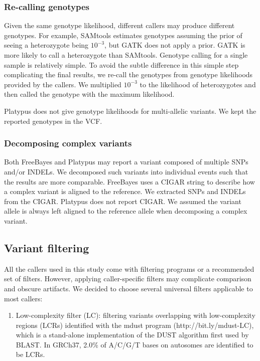 \documentclass{bioinfo-ori}
\begin{document}
\begin{methods}
\subsubsection{Re-calling genotypes} Given the same genotype likelihood,
different callers may produce different genotypes. For example, SAMtools
estimates genotypes assuming the prior of seeing a heterozygote being $10^{-3}$,
but GATK does not apply a prior. GATK is more likely to call a heterozygote
than SAMtools. Genotype calling for a single sample is relatively simple.
To avoid the subtle difference in this simple step complicating the final
results, we re-call the genotypes from genotype likelihoods provided by the
callers.  We multiplied $10^{-3}$ to the likelihood of heterozygotes and then
called the genotype with the maximum likelihood.

Platypus does not give genotype likelihoods for multi-allelic variants. We
kept the reported genotypes in the VCF.

\subsubsection{Decomposing complex variants} Both FreeBayes and Platypus may
report a variant composed of multiple SNPs and/or INDELs. We decomposed such
variants into individual events such that the results are more comparable.
FreeBayes uses a CIGAR string to describe how a complex variant is aligned to
the reference. We extracted SNPs and INDELs from the CIGAR. Platypus does not
report CIGAR. We assumed the variant allele is always left aligned to the
reference allele when decomposing a complex variant.

\subsection{Variant filtering}\label{sec:flt}

All the callers used in this study come with filtering programs or a recommended
set of filters. However, applying caller-specific filters may complicate
comparison and obscure artifacts. We decided to choose several universal
filters applicable to most callers:

\begin{enumerate}

\item Low-complexity filter (LC): filtering variants overlapping with
low-complexity regions (LCRs) identified with the mdust program
(http://bit.ly/mdust-LC), which is a stand-alone implementation of the DUST
algorithm first used by BLAST. In GRCh37, 2.0\% of A/C/G/T bases on autosomes
are identified to be LCRs.


\end{enumerate}
\end{methods}
\end{document}
